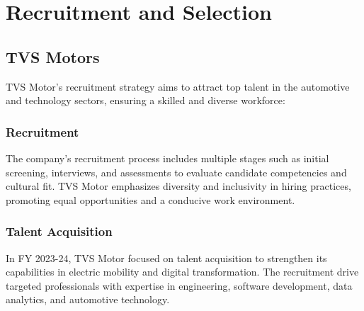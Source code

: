 \section{Recruitment and Selection}

\subsection{TVS Motors}

TVS Motor’s recruitment strategy aims to attract top talent in the automotive and technology sectors, ensuring a skilled and diverse workforce:

\subsubsection{Recruitment}
The company’s recruitment process includes multiple stages such as initial screening, interviews, and assessments to evaluate candidate competencies and cultural fit. TVS Motor emphasizes diversity and inclusivity in hiring practices, promoting equal opportunities and a conducive work environment.

\subsubsection{Talent Acquisition}
In FY 2023-24, TVS Motor focused on talent acquisition to strengthen its capabilities in electric mobility and digital transformation. The recruitment drive targeted professionals with expertise in engineering, software development, data analytics, and automotive technology.

